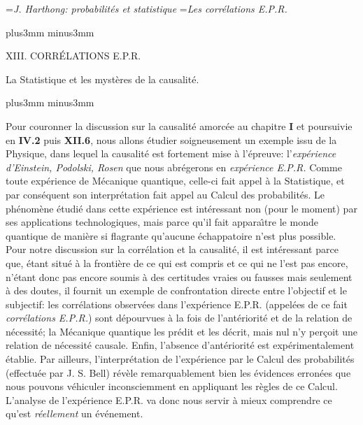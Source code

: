


\auteurcourant={\sl J. Harthong: probabilit\'es et statistique}
\titrecourant={\sl Les corr\'elations E.P.R.}


\vskip10mm plus3mm minus3mm

\centerline{\tit XIII. CORR\'ELATIONS E.P.R.}
\vskip8pt
\centerline{\tit La Statistique et les myst\`eres de la causalit\'e.}

\vskip10mm plus3mm minus3mm

Pour couronner la discussion sur la causalit\'e amorc\'ee au chapitre 
{\bf I} et poursuivie en {\bf IV.2} puis {\bf XII.6}, nous allons 
\'etudier soigneusement un exemple issu  de la Physique, dans lequel 
la causalit\'e est fortement mise \`a l'\'epreuve: l'{\it exp\'erience 
d'Einstein, Podolski, Rosen} que nous abr\'egerons en {\it exp\'erience 
E.P.R.} Comme toute exp\'erience de M\'ecanique quantique, celle-ci  
fait appel \`a la Statistique, et par cons\'equent son interpr\'etation  
fait appel au Calcul des probabilit\'es. Le ph\'enom\`ene \'etudi\'e  dans 
cette exp\'erience est int\'eressant non (pour  le moment) par ses 
applications technologiques, mais parce qu'il fait  appara\^\i tre le  
monde quantique de mani\`ere si flagrante qu'aucune \'echappatoire  
n'est plus possible. Pour notre discussion sur la corr\'elation et la 
causalit\'e, il est int\'eressant parce  que, \'etant situ\'e \`a la 
fronti\`ere de ce qui est compris et ce qui ne l'est pas encore, n'\'etant 
donc pas encore soumis \`a des certitudes vraies ou fausses mais 
seulement \`a des doutes, il fournit un exemple de confrontation directe 
entre l'objectif et le subjectif: les corr\'elations observ\'ees dans 
l'exp\'erience  E.P.R. (appel\'ees de ce fait {\it corr\'elations E.P.R.}) 
sont d\'epourvues \`a la fois de l'ant\'eriorit\'e et de la relation de 
n\'ecessit\'e; la M\'ecanique  quantique les pr\'edit et les d\'ecrit, mais 
nul n'y per\c{c}oit une relation de n\'ecessit\'e causale. Enfin, 
l'absence d'ant\'eriorit\'e est exp\'erimentalement \'etablie.    
\medskip 
Par ailleurs, l'interpr\'etation de l'exp\'erience par le Calcul des  
probabilit\'es (effectu\'ee par J. S. Bell) r\'ev\`ele remarquablement bien
les \'evidences erron\'ees que nous pouvons v\'ehiculer inconsciemment  
en appliquant les r\`egles de ce Calcul. L'analyse de l'exp\'erience E.P.R.  
va donc nous servir \`a mieux comprendre ce qu'est {\it r\'eellement} un 
\'ev\'enement.  
 
